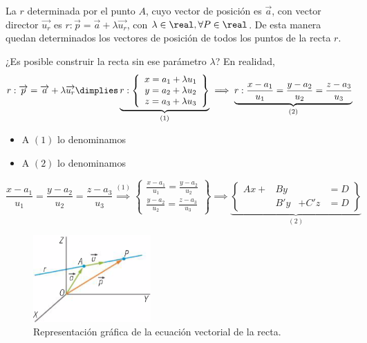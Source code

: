 La 
%
 $r$ determinada por el punto $A$, cuyo vector de posición es $\vec{a}$, con vector director $\vec{u_r} $  es $r : \vec{p} = \vec{a} + \lambda \vec{u_r}$, con $\lambda\in\real, \forall P\in\real$.
%
De esta manera quedan determinados los vectores de posición de todos los puntos de la recta $r$.

¿Es posible construir la recta sin ese parámetro $\lambda$? En realidad,
$$r : \vec{p} = \vec{a} + \lambda \vec{u_r}\dimplies \underbrace{r:\displaystyle \left\{
\begin{array}{c} 
  x = a_1 + \lambda u_1\\
  y = a_2 + \lambda u_2 \\ 
  z = a_3 + \lambda u_3
\end{array}\right\}}_{(1)} \implies \underbrace{r:\frac{x-a_1}{u_1} = \frac{y-a_2}{u_2} = \frac{z-a_3}{u_3}}_{(2)}$$

\begin{itemize}
    \item A $(1)$ lo denominamos 
    \item A $(2)$ lo denominamos 
\end{itemize}

\[
\frac{x-a_1}{u_1} = \frac{y-a_2}{u_2} = \frac{z-a_3}{u_3}\overset{(1)}{\implies} \left\{
\begin{array}{c}
     \displaystyle\frac{x-a_1}{u_1} = \frac{y-a_2}{u_2}\\
     \displaystyle\frac{y-a_2}{u_2} = \frac{z-a_3}{u_3}
\end{array}\right\} \implies
\underbrace{\left\{\begin{array}{cccc}
     Ax + &By    &     & = D\\
          &B'y   &+ C'z  & = D
\end{array}\right\}}_{(2)}
\]


\begin{figure}[hptb]
    \centering
    \includegraphics[width=0.4\textwidth]{img/EcVectorialRecta.png}
    \caption{Representación gráfica de la ecuación vectorial de la recta.}
    \label{fig:plano}
\end{figure}


